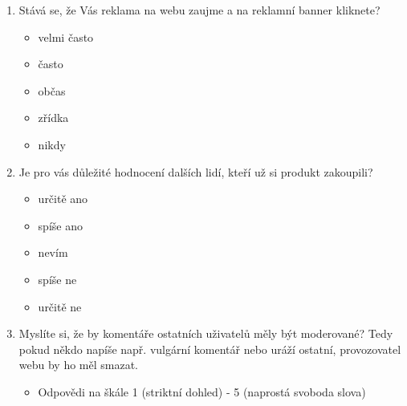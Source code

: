 \documentclass[12pt,twoside,openany]{fithesis}
\begin{document}
\begin{enumerate}
  \item Stává se, že Vás reklama na webu zaujme a na reklamní banner kliknete?
    \begin{itemize}
       \item velmi často
       \item často
       \item občas
       \item zřídka
       \item nikdy
    \end{itemize}

  \item Je pro vás důležité hodnocení dalších lidí, kteří už si produkt zakoupili?
    \begin{itemize}
       \item určitě ano
       \item spíše ano
       \item nevím
       \item spíše ne
       \item určitě ne
    \end{itemize}

  \item Myslíte si, že by komentáře ostatních uživatelů měly být moderované?
      Tedy pokud někdo napíše např. vulgární komentář nebo uráží ostatní, provozovatel webu by ho měl smazat.
    \begin{itemize}
        \item Odpovědi na škále 1 (striktní dohled) - 5 (naprostá svoboda slova)
    \end{itemize}

\end{enumerate}
\end{document}
